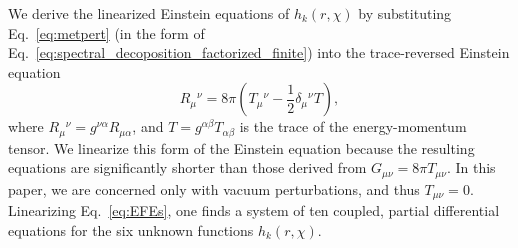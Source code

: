 \documentclass[aps,prx,amsmath,floats,floatfix,twocolumn,
  superscriptaddress,nofootinbib,showpacs]{revtex4-1}
\begin{document}
We derive the linearized Einstein equations of $h_k(r, \chi) $ by substituting Eq.~\eqref{eq:metpert} (in the form of Eq.~\eqref{eq:spectral_decoposition_factorized_finite}) into the trace-reversed Einstein equation 
\begin{equation}\label{eq:EFEs}
R_{\mu}{}^{\nu} = 8 \pi \left( T_{\mu}{}^{\nu} - \frac{1}{2} \delta_{\mu}{}^{\nu} T \right), 
\end{equation}
where $R_{\mu}{}^{\nu} = g^{\nu \alpha} R_{\mu \alpha}$, and $T = g^{\alpha \beta} T_{\alpha \beta}$ is the trace of the energy-momentum tensor. 
We linearize this form of the Einstein equation because the resulting equations are significantly shorter than those derived from $G_{\mu \nu} = 8 \pi T_{\mu \nu}$. 
In this paper, we are concerned only with vacuum perturbations, and thus $T_{\mu \nu} = 0$. 
Linearizing Eq.~\eqref{eq:EFEs}, one finds a system of ten coupled, partial differential equations for the six unknown functions $h_k(r,\chi)$. 
\end{document}
